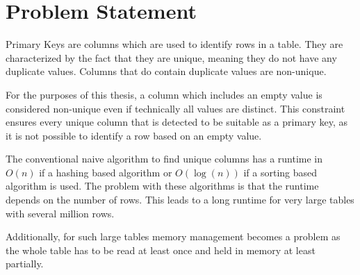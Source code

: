 \chapter{Problem Statement}\label{chap:problem_statement}
Primary Keys are columns which are used to identify rows in a table. They are characterized by the fact that they are unique, meaning they do not have any duplicate values. Columns that do contain duplicate values are non-unique.

For the purposes of this thesis, a column which includes an empty value is considered non-unique even if technically all values are distinct. This constraint ensures every unique column that is detected to be suitable as a primary key, as it is not possible to identify a row based on an empty value. %

The conventional naive algorithm to find unique columns has a runtime in \(O(n)\) if a hashing based algorithm or \(O(\log(n))\) if a sorting based algorithm is used. The problem with these algorithms is that the runtime depends on the number of rows. This leads to a long runtime for very large tables with several million rows. %

Additionally, for such large tables memory management becomes a problem as the whole table has to be read at least once and held in memory at least partially. %
